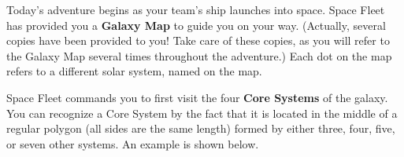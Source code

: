 Today's adventure begins as your team's ship launches into space.
Space Fleet has provided you a 
\textbf{Galaxy Map} to guide you on your way.
(Actually, several copies have been provided to you! Take care of
these copies, as you will refer to the Galaxy Map several times 
throughout the adventure.) Each dot on the map refers to a
different solar system, named on the map.

Space Fleet commands you to first visit the four 
\textbf{Core Systems} of
the galaxy. You can recognize a Core System by the fact that
it is located in the middle of a regular polygon
(all sides are the same length) formed by
either three, four, five, or seven other systems. An
example is shown below.

\begin{center}
\end{center}

